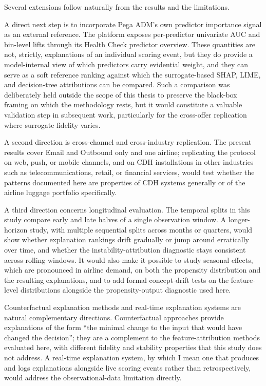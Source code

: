 \documentclass[oneside]{memoir} %
\begin{document}
Several extensions follow naturally from the results and the limitations.

A direct next step is to incorporate Pega ADM's own predictor importance signal as an external reference. The platform exposes per-predictor univariate AUC and bin-level lifts through its Health Check predictor overview. These quantities are not, strictly, explanations of an individual scoring event, but they do provide a model-internal view of which predictors carry evidential weight, and they can serve as a soft reference ranking against which the surrogate-based SHAP, LIME, and decision-tree attributions can be compared. Such a comparison was deliberately held outside the scope of this thesis to preserve the black-box framing on which the methodology rests, but it would constitute a valuable validation step in subsequent work, particularly for the cross-offer replication where surrogate fidelity varies.

A second direction is cross-channel and cross-industry replication. The present results cover Email and Outbound only and one airline; replicating the protocol on web, push, or mobile channels, and on CDH installations in other industries such as telecommunications, retail, or financial services, would test whether the patterns documented here are properties of CDH systems generally or of the airline luggage portfolio specifically.

A third direction concerns longitudinal evaluation. The temporal splits in this study compare early and late halves of a single observation window. A longer-horizon study, with multiple sequential splits across months or quarters, would show whether explanation rankings drift gradually or jump around erratically over time, and whether the instability-attribution diagnostic stays consistent across rolling windows. It would also make it possible to study seasonal effects, which are pronounced in airline demand, on both the propensity distribution and the resulting explanations, and to add formal concept-drift tests on the feature-level distributions alongside the propensity-output diagnostic used here.

Counterfactual explanation methods and real-time explanation systems are natural complementary directions. Counterfactual approaches \parencite{molnar_interpretable_2025} provide explanations of the form ``the minimal change to the input that would have changed the decision''; they are a complement to the feature-attribution methods evaluated here, with different fidelity and stability properties that this study does not address. A real-time explanation system, by which I mean one that produces and logs explanations alongside live scoring events rather than retrospectively, would address the observational-data limitation directly.
\end{document}
